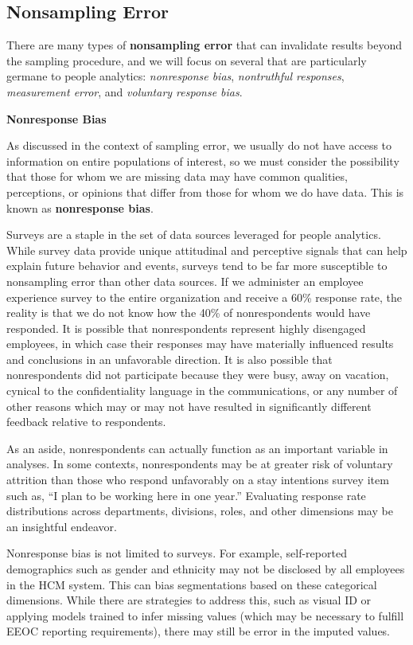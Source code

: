 \documentclass[
]{book}
\begin{document}
\hypertarget{nonsampling-error}{%
\subsection{Nonsampling Error}\label{nonsampling-error}}

There are many types of \textbf{nonsampling error} that can invalidate results beyond the sampling procedure, and we will focus on several that are particularly germane to people analytics: \emph{nonresponse bias}, \emph{nontruthful responses}, \emph{measurement error}, and \emph{voluntary response bias}.

\textbf{Nonresponse Bias}

As discussed in the context of sampling error, we usually do not have access to information on entire populations of interest, so we must consider the possibility that those for whom we are missing data may have common qualities, perceptions, or opinions that differ from those for whom we do have data. This is known as \textbf{nonresponse bias}.

Surveys are a staple in the set of data sources leveraged for people analytics. While survey data provide unique attitudinal and perceptive signals that can help explain future behavior and events, surveys tend to be far more susceptible to nonsampling error than other data sources. If we administer an employee experience survey to the entire organization and receive a 60\% response rate, the reality is that we do not know how the 40\% of nonrespondents would have responded. It is possible that nonrespondents represent highly disengaged employees, in which case their responses may have materially influenced results and conclusions in an unfavorable direction. It is also possible that nonrespondents did not participate because they were busy, away on vacation, cynical to the confidentiality language in the communications, or any number of other reasons which may or may not have resulted in significantly different feedback relative to respondents.

As an aside, nonrespondents can actually function as an important variable in analyses. In some contexts, nonrespondents may be at greater risk of voluntary attrition than those who respond unfavorably on a stay intentions survey item such as, ``I plan to be working here in one year.'' Evaluating response rate distributions across departments, divisions, roles, and other dimensions may be an insightful endeavor.

Nonresponse bias is not limited to surveys. For example, self-reported demographics such as gender and ethnicity may not be disclosed by all employees in the HCM system. This can bias segmentations based on these categorical dimensions. While there are strategies to address this, such as visual ID or applying models trained to infer missing values (which may be necessary to fulfill EEOC reporting requirements), there may still be error in the imputed values.
\end{document}
